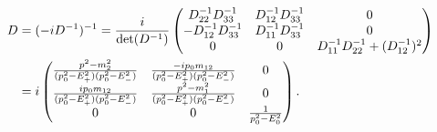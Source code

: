 \documentclass{article}
\begin{document}
\begin{align}
    \notag
    D & = (- iD^{-1})^{-1} = \frac{i}{\det(D^{-1})}
    \begin{pmatrix}
        D^{-1}_{22} D^{-1}_{33}   & D^{-1}_{12}D^{-1}_{33}  & 0 \\
        -D^{-1}_{12}D^{-1}_{33}   & D^{-1}_{11}D^{-1}_{33}  & 0 \\
        0               & 0             & D^{-1}_{11}D^{-1}_{22} + (D^{-1}_{12})^2
    \end{pmatrix} \\
    \label{free pion propagator}
    & = i
    \begin{pmatrix}
        \frac{
            p^2 - m_2^2
        }
        {
            (p_0^2 - E_+^2)(p_0^2 - E_-^2)
        } 
        & \frac{
            - ip_0m_{12}
        }
        {
            (p_0^2 - E_+^2)(p_0^2 - E_-^2)
        } & 0 \\
        \frac{
            ip_0m_{12}
        }
        {
            (p_0^2 - E_+^2)(p_0^2 - E_-^2)
        }
        & \frac{
            p^2 - m_1^2
        }
        {
            (p_0^2 - E_+^2)(p_0^2 - E_-^2)
        } & 0 \\
        0 & 0 & 
        \frac{1}{p_0^2 - E_0^2}
    \end{pmatrix}.
\end{align}
\end{document}
